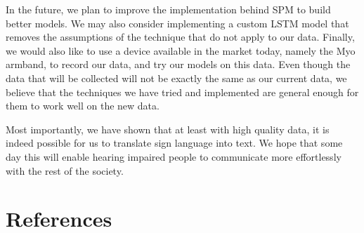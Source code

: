 \documentclass[twocolumn]{article}
\begin{document}
In the future, we plan to improve the implementation behind SPM to build better models. We may also consider implementing a custom LSTM model that removes the assumptions of the technique that do not apply to our data. Finally, we would also like to use a device available in the market today, namely the Myo armband, to record our data, and try our models on this data. Even though the data that will be collected will not be exactly the same as our current data, we believe that the techniques we have tried and implemented are general enough for them to work well on the new data. 

Most importantly, we have shown that at least with high quality data, it is indeed possible for us to translate sign language into text. We hope that some day this will enable hearing impaired people to communicate more effortlessly with the rest of the society.
\newpage
\section{References}
\printbibliography[heading=none]
\end{document}
